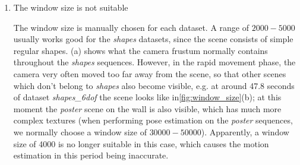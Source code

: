\begin{enumerate}
\item The window size is not suitable

  The window size is manually chosen for each dataset. A range of
  $2000 - 5000$ usually works good for the \textit{shapes} datasets,
  since the scene consists of simple regular
  shapes. (a) shows what the camera frustum
  normally contains throughout the \emph{shapes} sequences. However,
  in the rapid movement phase, the camera very often moved too far
  away from the scene, so that other scenes which don't belong to
  \textit{shapes} also become visible, e.g. at around 47.8 seconds of
  dataset \emph{shapes\_6dof} the scene looks like
  in\cref{fig:window_size}(b); at this moment the \emph{poster} scene
  on the wall is also visible, which has much more complex textures
  (when performing pose estimation on the \textit{poster} sequences,
  we normally choose a window size of $30000-50000$). Apparently, a
  window size of 4000 is no longer suitable in this case, which causes
  the motion estimation in this period being inaccurate.


\end{enumerate}
